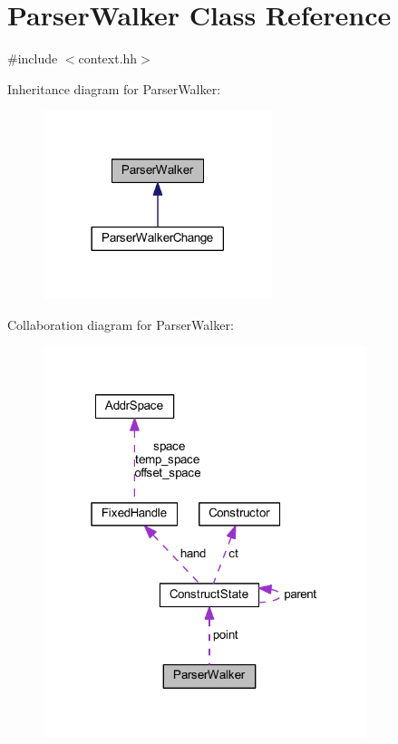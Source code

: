 \hypertarget{class_parser_walker}{}\section{Parser\+Walker Class Reference}
\label{class_parser_walker}


{\ttfamily \#include $<$context.\+hh$>$}



Inheritance diagram for Parser\+Walker\+:
\nopagebreak
\begin{figure}[H]
\begin{center}
\leavevmode
\includegraphics[width=189pt]{class_parser_walker__inherit__graph}
\end{center}
\end{figure}


Collaboration diagram for Parser\+Walker\+:
\nopagebreak
\begin{figure}[H]
\begin{center}
\leavevmode
\includegraphics[width=268pt]{class_parser_walker__coll__graph}
\end{center}
\end{figure}
